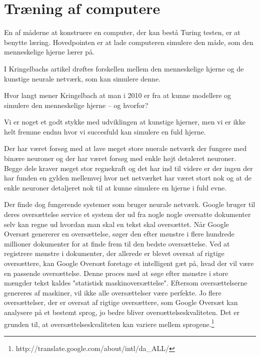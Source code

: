 \section{Træning af computere}

En af måderne at konstruere en computer, der kan bestå Turing testen, er at
benytte læring. Hovedpointen er at lade computeren simulere den måde, som den
menneskelige hjerne lærer på.

I Kringelbachs artikel drøftes forskellen mellem den menneskelige hjerne og
de kunstige neurale netværk, som kan simulere denne.

Hvor langt mener Kringelbach at man i 2010 er fra at kunne modellere og
simulere den menneskelige hjerne – og hvorfor?


Vi er noget et godt stykke med udviklingen at kunstige hjerner, men vi er
ikke helt fremme endnu hvor vi succesfuld kan simulere en fuld hjerne.

Der har været forsøg med at lave meget store nuerale netværk der fungere med
binære neuroner og der har været forsøg med enkle højt detaleret neuroner.
Begge dele kraver meget stor regnekraft og det har ind til videre er der ingen
der har funden en gylden mellemvej hvor net netværket har været stort nok
og at de enkle neuroner detaljeret nok til at kunne simulere en hjerne i fuld
evne.

Der finde dog fungerende systemer som bruger neurale netværk. Google
bruger til deres oversættelse service et system der ud fra nogle nogle
oversatte dokumenter selv kan regne ud hvordan man skal en tekst skal
oversættet. Når Google Oversæt genererer en oversættelse, søger den
efter mønstre i flere hundrede millioner dokumenter for at finde frem
til den bedste oversættelse. Ved at registrere mønstre i dokumenter,
der allerede er blevet oversat af rigtige oversættere, kan Google
Oversæt foretage et intelligent gæt på, hvad der vil være en passende
oversættelse. Denne proces med at søge efter mønstre i store mængder
tekst kaldes "statistisk maskinoversættelse". Eftersom oversættelserne
genereres af maskiner, vil ikke alle oversættelser være perfekte. Jo flere
oversættelser, der er oversat af rigtige oversættere, som Google Oversæt
kan analysere på et bestemt sprog, jo bedre bliver oversættelseskvaliteten.
Det er grunden til, at oversættelseskvaliteten kan variere mellem
sprogene.\footnote{http://translate.google.com/about/intl/da\_ALL/}

